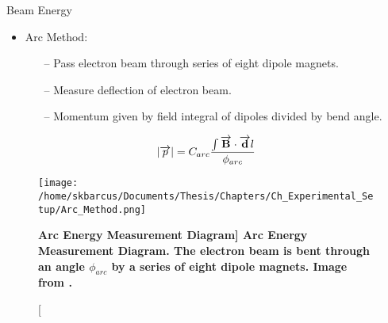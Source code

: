 \documentclass[10pt]{beamer}
\begin{document}
\begin{frame}[fragile]{Beam Energy}

	\begin{itemize}
		\item \alert{Arc Method}:
			\begin{itemize}
				\item[--] Pass electron beam through series of eight dipole magnets.
				\item[--] Measure \alert{deflection} of electron beam.
				\item[--] Momentum given by field integral of dipoles divided by bend angle. 
			\end{itemize}
	\end{itemize}
	
	\vspace{-3mm}
	\begin{equation} \label{eq:arc}
		|\overrightarrow{p}| = C_{arc} \frac{\int \overrightarrow{\rm \textbf{B}} \cdot \overrightarrow{\rm \textbf{d}}l}{\phi_{arc}}
	\end{equation}
	
	\begin{figure}[!ht]
	\begin{center}
	\texttt{[image: /home/skbarcus/Documents/Thesis/Chapters/Ch\_Experimental\_Setup/Arc\_Method.png]}
	\end{center}
	\caption[\bf{Arc Energy Measurement Diagram}]{
	{\bf{Arc Energy Measurement Diagram.}} The electron beam is bent through an angle $\phi_{arc}$ by a series of eight dipole magnets. Image from \cite{Thesis:Wang}.}
	\label{fig:halla_top}
	\end{figure}
	
\end{frame}
\end{document}
